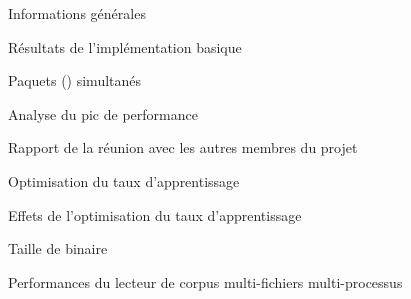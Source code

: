 \newpage
\begin{report}{Informations générales}\label{anx:info}
	
\end{report}
\begin{report}{Résultats de l'implémentation basique}\label{anx:first}
	
\end{report}
\begin{report}{Paquets () simultanés}\label{anx:batch}

\end{report}
\begin{report}{Analyse du pic de performance}\label{anx:spike}

\end{report}
\begin{report}{Rapport de la réunion avec les autres membres du projet}\label{anx:meeting}

\end{report}
\begin{report}{Optimisation du taux d'apprentissage}\label{anx:lr_1}

\end{report}
\begin{report}{Effets de l'optimisation du taux d'apprentissage}\label{anx:lr_2}

\end{report}
\begin{report}{Taille de  binaire}\label{anx:binary_size}

\end{report}
\begin{report}{Performances du lecteur de corpus multi-fichiers multi-processus}\label{anx:multi_process}

\end{report}
